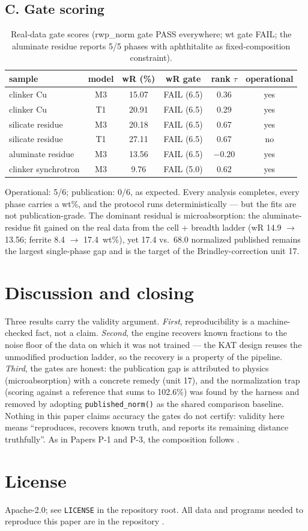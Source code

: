 \documentclass[11pt,a4paper]{article}
\begin{document}
\subsection{C. Gate scoring}
\begin{table}[ht]
\centering
\small
\begin{tabular}{@{}lccccc@{}}
\toprule
sample & model & wR (\%) & wR gate & rank $\tau$ & operational \\
\midrule
clinker Cu & M3 & 15.07 & FAIL (6.5) & 0.36 & yes \\
clinker Cu & T1 & 20.91 & FAIL (6.5) & 0.29 & yes \\
silicate residue & M3 & 20.18 & FAIL (6.5) & 0.67 & yes \\
silicate residue & T1 & 27.11 & FAIL (6.5) & 0.67 & no \\
aluminate residue & M3 & 13.56 & FAIL (6.5) & $-0.20$ & yes \\
clinker synchrotron & M3 & 9.76 & FAIL (5.0) & 0.62 & yes \\
\bottomrule
\end{tabular}
\caption{Real-data gate scores (rwp\_norm gate PASS everywhere;
wt gate FAIL; the aluminate residue reports 5/5 phases with aphthitalite
as fixed-composition constraint).}
\label{tab:gates}
\end{table}
Operational: 5/6; publication: 0/6, as expected. Every analysis
completes, every phase carries a wt\%, and the protocol runs
deterministically --- but the fits are not publication-grade. The
dominant residual is microabsorption: the aluminate-residue fit gained
on the real data from the cell + breadth ladder (wR 14.9 $\to$ 13.56;
ferrite 8.4 $\to$ 17.4~wt\%), yet 17.4 vs.\ 68.0 normalized published
remains the largest single-phase gap and is the target of the
Brindley-correction unit 17.

\section{Discussion and closing}
Three results carry the validity argument. \emph{First},
reproducibility is a machine-checked fact, not a claim. \emph{Second},
the engine recovers known fractions to the noise floor of the data on
which it was not trained --- the KAT design reuses the unmodified
production ladder, so the recovery is a property of the pipeline.
\emph{Third}, the gates are honest: the publication gap is attributed to
physics (microabsorption) with a concrete remedy (unit 17), and the
normalization trap (scoring against a reference that sums to 102.6\%) was
found by the harness and removed by adopting \texttt{published\_norm()}
as the shared comparison baseline. Nothing in this paper claims accuracy
the gates do not certify: validity here means ``reproduces, recovers
known truth, and reports its remaining distance truthfully''.
As in Papers P-1 and P-3, the composition follows
\cite{drake2025fifteen}.

\section*{License}
Apache-2.0; see \texttt{LICENSE} in the repository root. All data and
programs needed to reproduce this paper are in the repository
\cite{rietveld-agent}.



\end{document}
